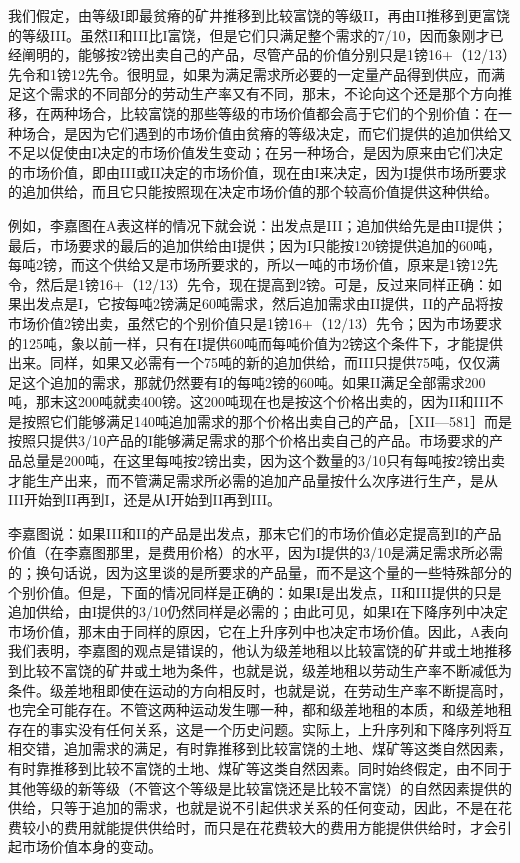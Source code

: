我们假定，由等级I即最贫瘠的矿井推移到比较富饶的等级II，再由II推移到更富饶的等级III。虽然II和III比I富饶，但是它们只满足整个需求的7/10，因而象刚才已经阐明的，能够按2镑出卖自己的产品，尽管产品的价值分别只是1镑16+（12/13）先令和1镑12先令。很明显，如果为满足需求所必要的一定量产品得到供应，而满足这个需求的不同部分的劳动生产率又有不同，那末，不论向这个还是那个方向推移，在两种场合，比较富饶的那些等级的市场价值都会高于它们的个别价值：在一种场合，是因为它们遇到的市场价值由贫瘠的等级决定，而它们提供的追加供给又不足以促使由I决定的市场价值发生变动；在另一种场合，是因为原来由它们决定的市场价值，即由III或II决定的市场价值，现在由I来决定，因为I提供市场所要求的追加供给，而且它只能按照现在决定市场价值的那个较高价值提供这种供给。


例如，李嘉图在A表这样的情况下就会说：出发点是III；追加供给先是由II提供；最后，市场要求的最后的追加供给由I提供；因为I只能按120镑提供追加的60吨，每吨2镑，而这个供给又是市场所要求的，所以一吨的市场价值，原来是1镑12先令，然后是1镑16+（12/13）先令，现在提高到2镑。可是，反过来同样正确：如果出发点是I，它按每吨2镑满足60吨需求，然后追加需求由II提供，II的产品将按市场价值2镑出卖，虽然它的个别价值只是1镑16+（12/13）先令；因为市场要求的125吨，象以前一样，只有在I提供60吨而每吨价值为2镑这个条件下，才能提供出来。同样，如果又必需有一个75吨的新的追加供给，而III只提供75吨，仅仅满足这个追加的需求，那就仍然要有I的每吨2镑的60吨。如果II满足全部需求200吨，那末这200吨就卖400镑。这200吨现在也是按这个价格出卖的，因为II和III不是按照它们能够满足140吨追加需求的那个价格出卖自己的产品，［XII—581］而是按照只提供3/10产品的I能够满足需求的那个价格出卖自己的产品。市场要求的产品总量是200吨，在这里每吨按2镑出卖，因为这个数量的3/10只有每吨按2镑出卖才能生产出来，而不管满足需求所必需的追加产品量按什么次序进行生产，是从III开始到II再到I，还是从I开始到II再到III。

李嘉图说：如果III和II的产品是出发点，那末它们的市场价值必定提高到I的产品价值（在李嘉图那里，是费用价格）的水平，因为I提供的3/10是满足需求所必需的；换句话说，因为这里谈的是所要求的产品量，而不是这个量的一些特殊部分的个别价值。但是，下面的情况同样是正确的：如果I是出发点，II和III提供的只是追加供给，由I提供的3/10仍然同样是必需的；由此可见，如果I在下降序列中决定市场价值，那末由于同样的原因，它在上升序列中也决定市场价值。因此，A表向我们表明，李嘉图的观点是错误的，他认为级差地租以比较富饶的矿井或土地推移到比较不富饶的矿井或土地为条件，也就是说，级差地租以劳动生产率不断减低为条件。级差地租即使在运动的方向相反时，也就是说，在劳动生产率不断提高时，也完全可能存在。不管这两种运动发生哪一种，都和级差地租的本质，和级差地租存在的事实没有任何关系，这是一个历史问题。实际上，上升序列和下降序列将互相交错，追加需求的满足，有时靠推移到比较富饶的土地、煤矿等这类自然因素，有时靠推移到比较不富饶的土地、煤矿等这类自然因素。同时始终假定，由不同于其他等级的新等级（不管这个等级是比较富饶还是比较不富饶）的自然因素提供的供给，只等于追加的需求，也就是说不引起供求关系的任何变动，因此，不是在花费较小的费用就能提供供给时，而只是在花费较大的费用方能提供供给时，才会引起市场价值本身的变动。

